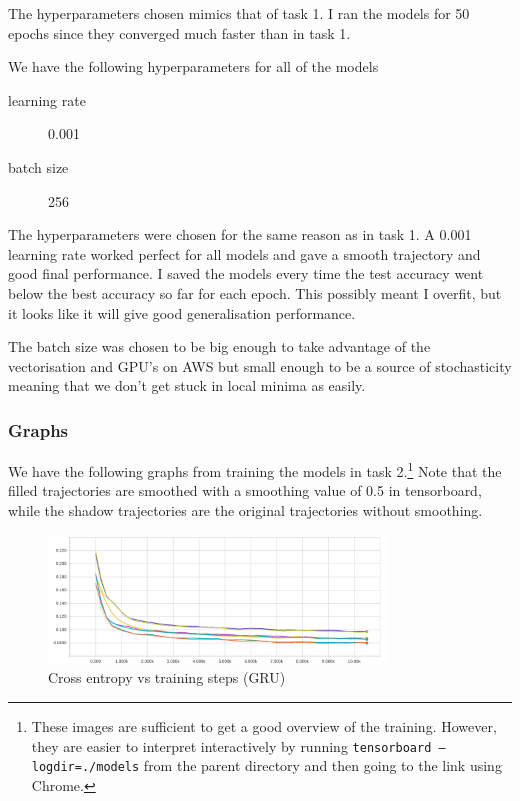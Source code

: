 \documentclass{article}
\begin{document}
The hyperparameters chosen mimics that of task 1. I ran the models for 50 epochs
since they converged much faster than in task 1.

We have the following hyperparameters for all of the models

\begin{description}
\item[learning rate] 0.001
\item[batch size] 256
\end{description}

The hyperparameters were chosen for the same reason as in task 1. A 0.001
learning rate worked perfect for all models and gave a smooth trajectory and
good final performance. I saved the models every time the test accuracy went
below the best accuracy so far for each epoch. This possibly meant I overfit,
but it looks like it will give good generalisation performance.

The batch size was chosen to be big enough to take advantage of the
vectorisation and GPU's on AWS but small enough to be a source of stochasticity
meaning that we don't get stuck in local minima as easily.

\subsubsection{Graphs}

We have the following graphs from training the models in task 2.\footnote{These images are
sufficient to get a good overview of the training. However, they are easier to
interpret interactively by running \texttt{tensorboard
  --logdir=./models} from the parent directory and then going to the
link using Chrome.} Note that the filled trajectories are smoothed with a
smoothing value of 0.5 in tensorboard, while the shadow trajectories are the
original trajectories without smoothing.

\begin{figure}[H]
  \centering
  \includegraphics[width=0.8\textwidth]{task2/GRU_task2_loss.png}
  \caption{Cross entropy vs training steps (GRU)}
  \label{fig:GRU_Xent_2}
\end{figure}
\end{document}
